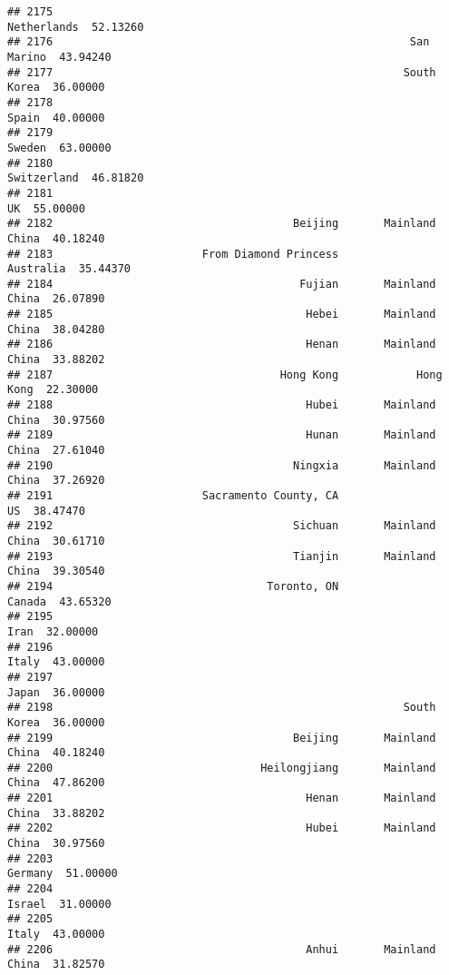 \documentclass[
]{article}
\begin{document}
\begin{verbatim}
## 2175                                                      Netherlands  52.13260
## 2176                                                       San Marino  43.94240
## 2177                                                      South Korea  36.00000
## 2178                                                            Spain  40.00000
## 2179                                                           Sweden  63.00000
## 2180                                                      Switzerland  46.81820
## 2181                                                               UK  55.00000
## 2182                                     Beijing       Mainland China  40.18240
## 2183                       From Diamond Princess            Australia  35.44370
## 2184                                      Fujian       Mainland China  26.07890
## 2185                                       Hebei       Mainland China  38.04280
## 2186                                       Henan       Mainland China  33.88202
## 2187                                   Hong Kong            Hong Kong  22.30000
## 2188                                       Hubei       Mainland China  30.97560
## 2189                                       Hunan       Mainland China  27.61040
## 2190                                     Ningxia       Mainland China  37.26920
## 2191                       Sacramento County, CA                   US  38.47470
## 2192                                     Sichuan       Mainland China  30.61710
## 2193                                     Tianjin       Mainland China  39.30540
## 2194                                 Toronto, ON               Canada  43.65320
## 2195                                                             Iran  32.00000
## 2196                                                            Italy  43.00000
## 2197                                                            Japan  36.00000
## 2198                                                      South Korea  36.00000
## 2199                                     Beijing       Mainland China  40.18240
## 2200                                Heilongjiang       Mainland China  47.86200
## 2201                                       Henan       Mainland China  33.88202
## 2202                                       Hubei       Mainland China  30.97560
## 2203                                                          Germany  51.00000
## 2204                                                           Israel  31.00000
## 2205                                                            Italy  43.00000
## 2206                                       Anhui       Mainland China  31.82570

\end{verbatim}
\end{document}
